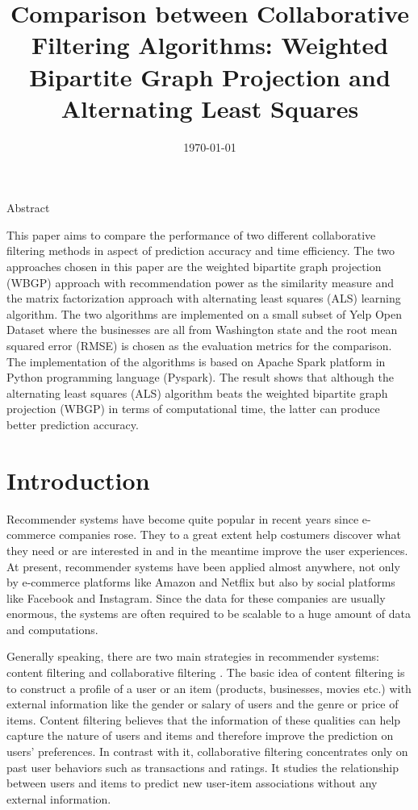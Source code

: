 \documentclass{article}
\title{Comparison between Collaborative Filtering Algorithms: 
Weighted Bipartite Graph Projection and Alternating Least Squares} %
\date{\today}
\begin{document}
\maketitle %



\begin{center}
  {\Large Abstract}
\end{center}



\noindent This paper aims to compare the performance of two different collaborative 
filtering methods in aspect of prediction accuracy and time efficiency. The two approaches
chosen in this paper are the weighted bipartite graph projection (WBGP) approach with 
recommendation power as the similarity measure and the matrix factorization approach 
with alternating least squares (ALS) learning algorithm. The two algorithms are implemented 
on a small subset of Yelp Open Dataset where the businesses are all from Washington state and 
the root mean squared error (RMSE) is chosen as the evaluation metrics for the comparison. The 
implementation of the algorithms is based on Apache Spark platform in Python programming 
language (Pyspark). The result shows that although the alternating least squares (ALS) 
algorithm beats the weighted bipartite graph projection (WBGP) in terms of computational 
time, the latter can produce better prediction accuracy.


\section*{Introduction} %

\noindent Recommender systems have become quite popular in recent years 
since e-commerce companies rose. They to a great extent help costumers discover what they 
need or are interested in and in the meantime improve the user experiences. At present, recommender 
systems have been applied almost anywhere, not only by e-commerce platforms like Amazon and Netflix 
but also by social platforms like Facebook and Instagram. Since the data for these companies are 
usually enormous, the systems are often required to be scalable to a huge amount of data and computations.

\indent Generally speaking, there are two main strategies in recommender systems: content 
filtering and collaborative filtering \cite{koren2009matrix}. The basic idea of content filtering is to construct 
a profile of a user or an item (products, businesses, movies etc.) with external information like 
the gender or salary of users and the genre or price of items. Content filtering believes that the 
information of these qualities can help capture the nature of users and items and therefore improve 
the prediction on users’ preferences. In contrast with it, collaborative filtering concentrates only 
on past user behaviors such as transactions and ratings. It studies the relationship between users and 
items to predict new user-item associations without any external information. 
\end{document}
